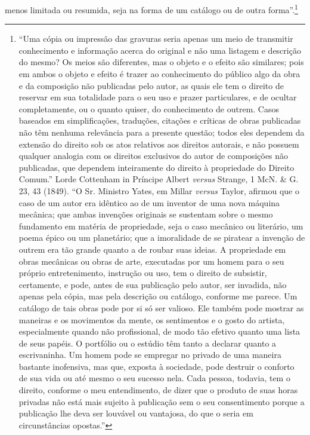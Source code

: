 menos limitada ou resumida, seja na forma de um catálogo ou de outra
forma''.\footnote{``Uma cópia ou impressão das gravuras seria apenas um
  meio de transmitir conhecimento e informação acerca do original e não
  uma listagem e descrição do mesmo? Os meios são diferentes, mas o
  objeto e o efeito são similares; pois em ambos o objeto e efeito é
  trazer ao conhecimento do público algo da obra e da composição não
  publicadas pelo autor, as quais ele tem o direito de reservar em sua
  totalidade para o seu uso e prazer particulares, e de ocultar
  completamente, ou o quanto quiser, do conhecimento de outrem. Casos
  baseados em simplificações, traduções, citações e críticas de obras
  publicadas não têm nenhuma relevância para a presente questão; todos
  eles dependem da extensão do direito sob os atos relativos aos
  direitos autorais, e não possuem qualquer analogia com os direitos
  exclusivos do autor de composições não publicadas, que dependem
  inteiramente do direito à propriedade do Direito Comum.'' Lorde
  Cottenham in Príncipe Albert \emph{versus} Strange, 1 McN. \& G. 23,
  43 (1849). ``O Sr. Ministro Yates, em Millar \emph{versus} Taylor,
  afirmou que o caso de um autor era idêntico ao de um inventor de uma
  nova máquina mecânica; que ambas invenções originais se sustentam
  sobre o mesmo fundamento em matéria de propriedade, seja o caso
  mecânico ou literário, um poema épico ou um planetário; que a
  imoralidade de se piratear a invenção de outrem era tão grande quanto
  a de roubar suas ideias. A propriedade em obras mecânicas ou obras de
  arte, executadas por um homem para o seu próprio entretenimento,
  instrução ou uso, tem o direito de subsistir, certamente, e pode,
  antes de sua publicação pelo autor, ser invadida, não apenas pela
  cópia, mas pela descrição ou catálogo, conforme me parece. Um catálogo
  de tais obras pode por si só ser valioso. Ele também pode mostrar as
  maneiras e os movimentos da mente, os sentimentos e o gosto do
  artista, especialmente quando não profissional, de modo tão efetivo
  quanto uma lista de seus papéis. O portfólio ou o estúdio têm tanto a
  declarar quanto a escrivaninha. Um homem pode se empregar no privado
  de uma maneira bastante inofensiva, mas que, exposta à sociedade, pode
  destruir o conforto de sua vida ou até mesmo o seu sucesso nela. Cada
  pessoa, todavia, tem o direito, conforme o meu entendimento, de dizer
  que o produto de suas horas privadas não está mais sujeito à
  publicação sem o seu consentimento porque a publicação lhe deva ser
  louvável ou vantajosa, do que o seria em circunstâncias opostas.''

}
